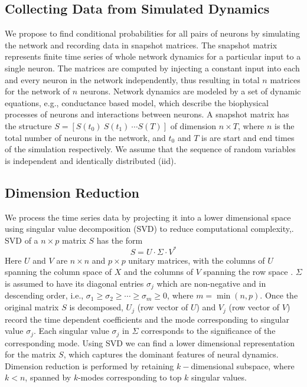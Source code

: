 \documentclass[letterpaper,11pt]{article}
\newcommand\tab[1][6mm]{\hspace*{#1}}
\begin{document}
\subsection{Collecting Data from Simulated Dynamics}
\tab We propose to find conditional probabilities for all pairs of neurons by simulating the network and recording data in snapshot matrices. The snapshot matrix represents finite time series of whole network dynamics for a particular input to a single neuron. The matrices are computed by injecting a constant input into each and every neuron in the network independently, thus resulting in total $n$ matrices for the network of $n$ neurons. Network dynamics are modeled by a set of dynamic equations, e.g., conductance based model, which describe the biophysical processes of neurons and interactions between neurons. A snapshot matrix has the structure $S=[S(t_0)\ S(t_1) \ \cdots S(T)]$ of dimension $n \times T$, where $n$ is the total number of neurons in the network, and $t_0$ and $T$ is are start and end times of the simulation respectively. We assume that the sequence of random variables is independent and identically distributed (iid).

\subsection{Dimension Reduction}
\tab We process the time series data by projecting it into a lower dimensional space using singular value decomposition (SVD) to reduce computational complexity,. SVD of a $n \times p$ matrix $S$ has the form
\[S=U\cdot \Sigma \cdot V^*\]
Here $U$ and $V$ are $n\times n$ and $p \times p$ unitary matrices, with the columns of $U$ spanning the column space of $X$ and the columns of $V$ spanning the row space \cite{ESL}. $\Sigma$ is assumed to have its diagonal entries $\sigma_j$ which are non-negative and in descending order, i.e., $\sigma_1\geq \sigma_2 \geq \cdots \geq \sigma_m\geq 0$, where $m=\min(n,p)$. Once the original matrix $S$ is decomposed, $U_j$ (row vector of $U$) and $V_j$ (row vector of $V$) record the time dependent coefficients and the mode corresponding to singular value $\sigma_j$. Each singular value $\sigma_j$ in $\Sigma$ corresponds to the significance of the corresponding mode. Using SVD we can find a lower dimensional representation for the matrix $S$, which captures the dominant features of neural dynamics. Dimension reduction is performed by retaining $k-$dimensional subspace, where $k<n$, spanned by $k$-modes corresponding to top $k$ singular values.
\end{document}

